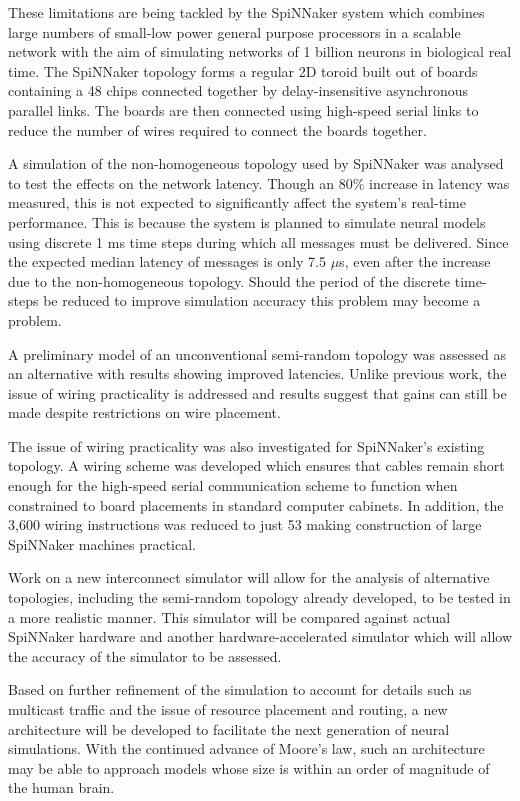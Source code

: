 	These limitations are being tackled by the SpiNNaker system which combines
	large numbers of small-low power general purpose processors in a scalable
	network with the aim of simulating networks of 1 billion neurons in biological
	real time. The SpiNNaker topology forms a regular 2D toroid built out of
	boards containing a 48 chips connected together by delay-insensitive
	asynchronous parallel links. The boards are then connected using high-speed
	serial links to reduce the number of wires required to connect the boards
	together.
	
	A simulation of the non-homogeneous topology used by SpiNNaker was analysed to
	test the effects on the network latency. Though an 80\% increase in latency
	was measured, this is not expected to significantly affect the system's
	real-time performance. This is because the system is planned to simulate
	neural models using discrete 1 ms time steps during which all messages must be
	delivered. Since the expected median latency of messages is only 7.5 $\mu$s,
	even after the increase due to the non-homogeneous topology. Should the period
	of the discrete time-steps be reduced to improve simulation accuracy this
	problem may become a problem.
	
	A preliminary model of an unconventional semi-random topology was assessed as
	an alternative with results showing improved latencies. Unlike previous work,
	the issue of wiring practicality is addressed and results suggest that gains
	can still be made despite restrictions on wire placement.
	
	The issue of wiring practicality was also investigated for SpiNNaker's
	existing topology. A wiring scheme was developed which ensures that cables
	remain short enough for the high-speed serial communication scheme to function
	when constrained to board placements in standard computer cabinets. In
	addition, the 3,600 wiring instructions was reduced to just 53 making
	construction of large SpiNNaker machines practical.
	
	Work on a new interconnect simulator will allow for the analysis of
	alternative topologies, including the semi-random topology already developed,
	to be tested in a more realistic manner. This simulator will be compared
	against actual SpiNNaker hardware and another hardware-accelerated simulator
	which will allow the accuracy of the simulator to be assessed.
	
	Based on further refinement of the simulation to account for details such as
	multicast traffic and the issue of resource placement and routing, a new
	architecture will be developed to facilitate the next generation of neural
	simulations. With the continued advance of Moore's law, such an architecture
	may be able to approach models whose size is within an order of magnitude of
	the human brain.
